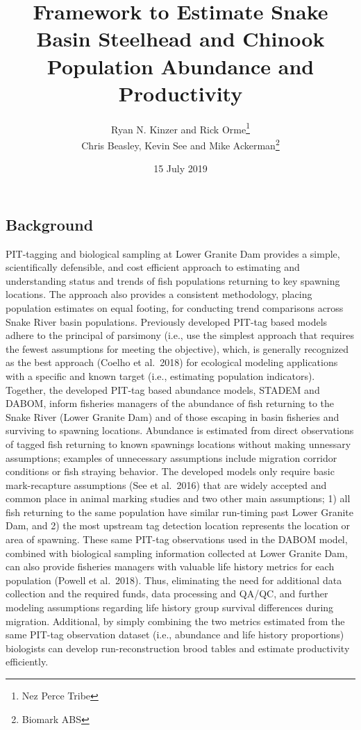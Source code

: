 \documentclass[]{article}
\title{Framework to Estimate Snake Basin Steelhead and Chinook Population
Abundance and Productivity}
\author{Ryan N. Kinzer and Rick Orme\footnote{Nez Perce Tribe} \\ Chris Beasley, Kevin See and Mike Ackerman\footnote{Biomark ABS}}
\date{15 July 2019}
\begin{document}
\maketitle

\hypertarget{background}{%
\subsection{Background}\label{background}}

PIT-tagging and biological sampling at Lower Granite Dam provides a
simple, scientifically defensible, and cost efficient approach to
estimating and understanding status and trends of fish populations
returning to key spawning locations. The approach also provides a
consistent methodology, placing population estimates on equal footing,
for conducting trend comparisons across Snake River basin populations.
Previously developed PIT-tag based models adhere to the principal of
parsimony (i.e., use the simplest approach that requires the fewest
assumptions for meeting the objective), which, is generally recognized
as the best approach (Coelho et al.~2018) for ecological modeling
applications with a specific and known target (i.e., estimating
population indicators). Together, the developed PIT-tag based abundance
models, STADEM and DABOM, inform fisheries managers of the abundance of
fish returning to the Snake River (Lower Granite Dam) and of those
escaping in basin fisheries and surviving to spawning locations.
Abundance is estimated from direct observations of tagged fish returning
to known spawnings locations without making unnessary assumptions;
examples of unnecessary assumptions include migration corridor
conditions or fish straying behavior. The developed models only require
basic mark-recapture assumptions (See et al.~2016) that are widely
accepted and common place in animal marking studies and two other main
assumptions; 1) all fish returning to the same population have similar
run-timing past Lower Granite Dam, and 2) the most upstream tag
detection location represents the location or area of spawning. These
same PIT-tag observations used in the DABOM model, combined with
biological sampling information collected at Lower Granite Dam, can also
provide fisheries managers with valuable life history metrics for each
population (Powell et al.~2018). Thus, eliminating the need for
additional data collection and the required funds, data processing and
QA/QC, and further modeling assumptions regarding life history group
survival differences during migration. Additional, by simply combining
the two metrics estimated from the same PIT-tag observation dataset
(i.e., abundance and life history proportions) biologists can develop
run-reconstruction brood tables and estimate productivity efficiently.
\end{document}
